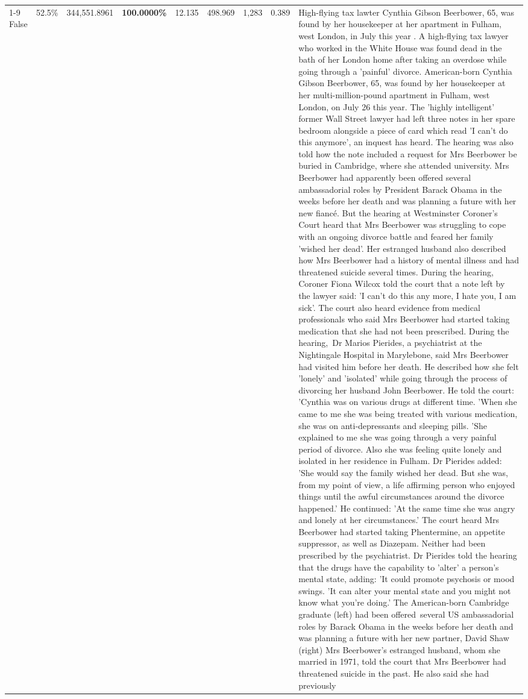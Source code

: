 \begin{table}[H]
\begin{tabular}{lllrlllll}
\cline{1-9}
False & 52.5\% & 344,551.8961 & \bfseries \color{red} 100.0000\% & 12.135 & 498.969 & 1,283 & 0.389 & High-flying tax lawter Cynthia Gibson Beerbower, 65, was found by her housekeeper at her apartment in Fulham, west London, in July this year . A high-flying tax lawyer who worked in the White House was found dead in the bath of her London home after taking an overdose while going through a 'painful' divorce. American-born Cynthia Gibson Beerbower, 65, was found by her housekeeper at her multi-million-pound apartment in Fulham, west London, on July 26 this year. The 'highly intelligent' former Wall Street lawyer had left three notes in her spare bedroom alongside a piece of card which read 'I can't do this anymore', an inquest has heard. The hearing was also told how the note included a request for Mrs Beerbower be buried in Cambridge, where she attended university. Mrs Beerbower had apparently been offered several ambassadorial roles by President Barack Obama in the weeks before her death and was planning a future with her new fiancé. But the hearing at Westminster Coroner's Court heard that Mrs Beerbower was struggling to cope with an ongoing divorce battle and feared her family 'wished her dead'. Her estranged husband also described how Mrs Beerbower had a history of mental illness and had threatened suicide several times. During the hearing, Coroner Fiona Wilcox told the court that a note left by the lawyer said: 'I can't do this any more, I hate you, I am sick'. The court also heard evidence from medical professionals who said Mrs Beerbower had started taking medication that she had not been prescribed. During the hearing, Dr Marios Pierides, a psychiatrist at the Nightingale Hospital in Marylebone, said Mrs Beerbower had visited him before her death. He described how she felt 'lonely' and 'isolated' while going through the process of divorcing her husband John Beerbower. He told the court: 'Cynthia was on various drugs at different time. 'When she came to me she was being treated with various medication, she was on anti-depressants and sleeping pills. 'She explained to me she was going through a very painful period of divorce. Also she was feeling quite lonely and isolated in her residence in Fulham. Dr Pierides added: 'She would say the family wished her dead. But she was, from my point of view, a life affirming person who enjoyed things until the awful circumstances around the divorce happened.' He continued: 'At the same time she was angry and lonely at her circumstances.' The court heard Mrs Beerbower had started taking Phentermine, an appetite suppressor, as well as Diazepam. Neither had been prescribed by the psychiatrist. Dr Pierides told the hearing that the drugs have the capability to 'alter' a person's mental state, adding: 'It could promote psychosis or mood swings. 'It can alter your mental state and you might not know what you're doing.' The American-born Cambridge graduate (left) had been offered several US ambassadorial roles by Barack Obama in the weeks before her death and was planning a future with her new partner, David Shaw (right) Mrs Beerbower's estranged husband, whom she married in 1971, told the court that Mrs Beerbower had threatened suicide in the past. He also said she had previously 
\end{tabular}
\end{table}
